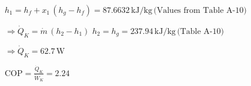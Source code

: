 \( h_1 = h_f + x_1 \, (h_g - h_f) = 87.6632 \, \text{kJ/kg} \, \text{(Values from Table A-10)} \)  

\( \Rightarrow \dot{Q}_K = \dot{m} \, (h_2 - h_1) \)  
\( h_2 = h_g = 237.94 \, \text{kJ/kg} \, \text{(Table A-10)} \)  

\( \Rightarrow \dot{Q}_K = 62.7 \, \text{W} \)  

\( \text{COP} = \frac{\dot{Q}_K}{\dot{W}_K} = 2.24 \)